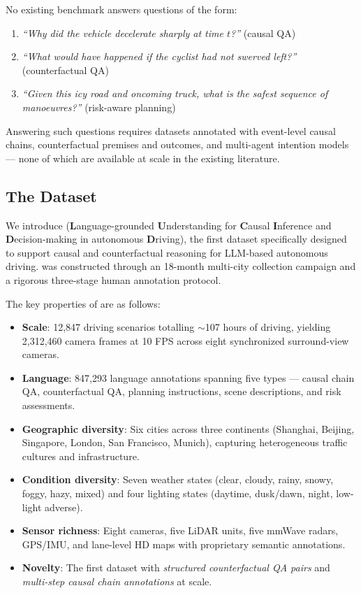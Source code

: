 No existing benchmark answers questions of the form:
\begin{enumerate}[leftmargin=2em, noitemsep]
  \item \emph{``Why did the vehicle decelerate sharply at time $t$?''} (causal QA)
  \item \emph{``What would have happened if the cyclist had not swerved left?''} (counterfactual QA)
  \item \emph{``Given this icy road and oncoming truck, what is the safest sequence of manoeuvres?''} (risk-aware planning)
\end{enumerate}
Answering such questions requires datasets annotated with event-level causal chains,
counterfactual premises and outcomes, and multi-agent intention models --- none of which
are available at scale in the existing literature.

\subsection*{The \lucid{} Dataset}

We introduce \lucid{} (\textbf{L}anguage-grounded \textbf{U}nderstanding for
\textbf{C}ausal \textbf{I}nference and \textbf{D}ecision-making in autonomous
\textbf{D}riving), the first dataset specifically designed to support causal and
counterfactual reasoning for LLM-based autonomous driving. \lucid{} was constructed
through an 18-month multi-city collection campaign and a rigorous three-stage human
annotation protocol.

The key properties of \lucid{} are as follows:
\begin{itemize}[leftmargin=2em, noitemsep]
  \item \textbf{Scale}: 12,847 driving scenarios totalling $\sim$107 hours of driving,
        yielding 2,312,460 camera frames at 10 FPS across eight synchronized surround-view cameras.
  \item \textbf{Language}: 847,293 language annotations spanning five types --- causal chain QA,
        counterfactual QA, planning instructions, scene descriptions, and risk assessments.
  \item \textbf{Geographic diversity}: Six cities across three continents (Shanghai, Beijing,
        Singapore, London, San Francisco, Munich), capturing heterogeneous traffic
        cultures and infrastructure.
  \item \textbf{Condition diversity}: Seven weather states (clear, cloudy, rainy, snowy,
        foggy, hazy, mixed) and four lighting states (daytime, dusk/dawn, night, low-light adverse).
  \item \textbf{Sensor richness}: Eight cameras, five LiDAR units, five mmWave radars,
        GPS/IMU, and lane-level HD maps with proprietary semantic annotations.
  \item \textbf{Novelty}: The first dataset with \emph{structured counterfactual QA pairs}
        and \emph{multi-step causal chain annotations} at scale.
\end{itemize}

